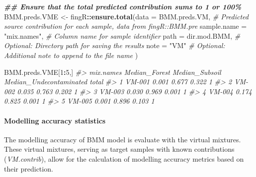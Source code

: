 \documentclass[
]{article}
\newenvironment{Shaded}{\begin{snugshade}}{\end{snugshade}}
\newcommand{\AttributeTok}[1]{\textcolor[rgb]{0.13,0.29,0.53}{#1}}
\newcommand{\CommentTok}[1]{\textcolor[rgb]{0.56,0.35,0.01}{\textit{#1}}}
\newcommand{\DecValTok}[1]{\textcolor[rgb]{0.00,0.00,0.81}{#1}}
\newcommand{\DocumentationTok}[1]{\textcolor[rgb]{0.56,0.35,0.01}{\textbf{\textit{#1}}}}
\newcommand{\FunctionTok}[1]{\textcolor[rgb]{0.13,0.29,0.53}{\textbf{#1}}}
\newcommand{\NormalTok}[1]{#1}
\newcommand{\OtherTok}[1]{\textcolor[rgb]{0.56,0.35,0.01}{#1}}
\newcommand{\SpecialCharTok}[1]{\textcolor[rgb]{0.81,0.36,0.00}{\textbf{#1}}}
\newcommand{\StringTok}[1]{\textcolor[rgb]{0.31,0.60,0.02}{#1}}
\begin{document}
\begin{Shaded}
\begin{Highlighting}[]
\DocumentationTok{\#\# Ensure that the total predicted contribution sums to 1 or 100\%}
\NormalTok{BMM.preds.VME }\OtherTok{\textless{}{-}}\NormalTok{ fingR}\SpecialCharTok{::}\FunctionTok{ensure.total}\NormalTok{(}\AttributeTok{data =}\NormalTok{ BMM.preds.VM,        }\CommentTok{\# Predicted source contribution for each sample, data from fingR::BMM.pre}
                                      \AttributeTok{sample.name =} \StringTok{"mix.names"}\NormalTok{, }\CommentTok{\# Column name for sample identifier}
                                      \AttributeTok{path =}\NormalTok{ dir.mod.BMM,        }\CommentTok{\# Optional: Directory path for saving the results}
                                      \AttributeTok{note =} \StringTok{"VM"}                \CommentTok{\# Optional: Additional note to append to the file name}
\NormalTok{                                      )}
\end{Highlighting}
\end{Shaded}

\begin{Shaded}
\begin{Highlighting}[]
\NormalTok{BMM.preds.VME[}\DecValTok{1}\SpecialCharTok{:}\DecValTok{5}\NormalTok{,]}
\CommentTok{\#\textgreater{}   mix.names Median\_Forest Median\_Subsoil Median\_Undecontaminated total}
\CommentTok{\#\textgreater{} 1    VM{-}001         0.001          0.677                   0.322     1}
\CommentTok{\#\textgreater{} 2    VM{-}002         0.035          0.763                   0.202     1}
\CommentTok{\#\textgreater{} 3    VM{-}003         0.030          0.969                   0.001     1}
\CommentTok{\#\textgreater{} 4    VM{-}004         0.174          0.825                   0.001     1}
\CommentTok{\#\textgreater{} 5    VM{-}005         0.001          0.896                   0.103     1}
\end{Highlighting}
\end{Shaded}

\hypertarget{modelling-accuracy-statistics}{%
\paragraph{Modelling accuracy
statistics}\label{modelling-accuracy-statistics}}

The modelling accuracy of BMM model is evaluate with the virtual
mixtures. These virtual mixtures, serving as target samples with known
contributions (\emph{VM.contrib}), allow for the calculation of
modelling accuracy metrics based on their prediction.
\end{document}
